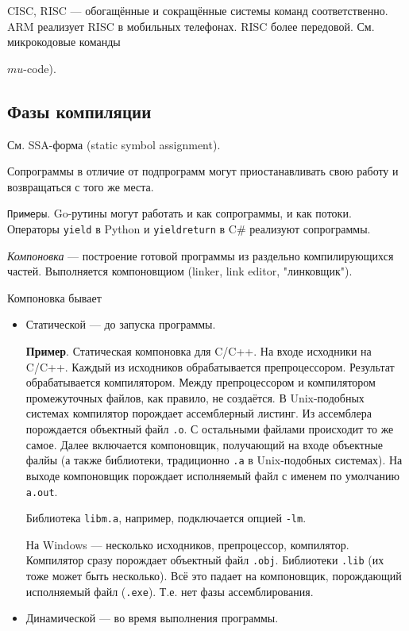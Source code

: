 \documentclass{article}
\begin{document}
CISC, RISC --- обогащённые и сокращённые системы команд соответственно. ARM
реализует RISC в мобильных телефонах. RISC более передовой. См. микрокодовые
команды {$mu$-code).

\subsection{Фазы компиляции}

См. SSA-форма (static symbol assignment).

Сопрограммы в отличие от подпрограмм могут приостанавливать свою работу и
возвращаться с того же места.

\texttt{Примеры}. Go-рутины могут работать и как сопрограммы, и как потоки.
Операторы \texttt{yield} в Python и \texttt{yieldreturn} в C\# реализуют
сопрограммы.

\textit{Компоновка} --- построение готовой программы из раздельно
компилирующихся частей. Выполняется компоновщиом (linker, link editor,
"линковщик").

Компоновка бывает
\begin{itemize}
  \item Статической --- до запуска программы.

    \textbf{Пример}. Статическая компоновка для C/C++. На входе исходники на
      C/C++. Каждый из исходников обрабатывается препроцессором. Результат
      обрабатывается компилятором. Между препроцессором и компилятором
      промежуточных файлов, как правило, не создаётся. В Unix-подобных системах
      компилятор порождает ассемблерный листинг. Из ассемблера порождается
      объектный файл \texttt{.o}. С остальными файлами происходит то же самое.
      Далее включается компоновщик, получающий на входе объектные фалйы (а также
      библиотеки, традиционно \texttt{.a} в Unix-подобных системах). На выходе
      компоновщик порождает исполняемый файл с именем по умолчанию
      \texttt{a.out}.

      Библиотека \texttt{libm.a}, например, подключается опцией \texttt{-lm}.

      На Windows --- несколько исходников, препроцессор, компилятор. Компилятор
      сразу порождает объектный файл \texttt{.obj}. Библиотеки \texttt{.lib} (их
      тоже может быть несколько). Всё это падает на компоновщик, порождающий
      исполняемый файл (\texttt{.exe}). Т.е. нет фазы ассемблирования.

  \item Динамической --- во время выполнения программы.


\end{itemize}}
\end{document}
